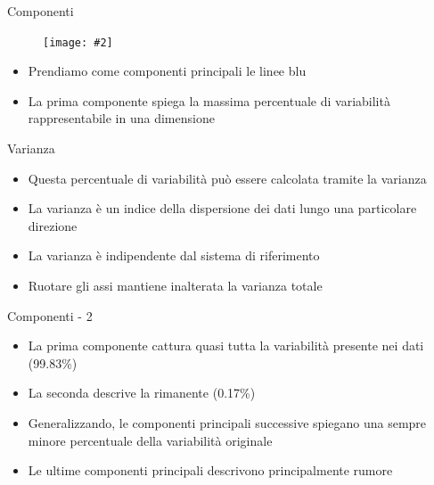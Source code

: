 \documentclass[xcolor={dvipsnames}]{beamer}%
\newcommand{\figcen}[2]{
	\begin{figure}
		\begin{center}
			\texttt{[image: \#2]}
		\end{center}
	\end{figure}
}
\begin{document}
		\begin{frame}{Componenti}
			\figcen{.7\textwidth}{componenti}
			\begin{itemize}
				\item Prendiamo come componenti principali le linee blu
				\item La prima componente spiega la massima percentuale di variabilità rappresentabile in una dimensione
			\end{itemize}
		\end{frame}
	
		\begin{frame}{Varianza}
			\begin{itemize}
				\item Questa percentuale di variabilità può essere calcolata tramite la varianza
				\item La varianza è un indice della dispersione dei dati lungo una particolare direzione
				\item La varianza è indipendente dal sistema di riferimento
				\item Ruotare gli assi mantiene inalterata la varianza totale
			\end{itemize}
		\end{frame}
	
		\begin{frame}{Componenti - 2}
			\begin{itemize}
				\item La prima componente cattura quasi tutta la variabilità presente nei dati (99.83\%)
				\item La seconda descrive la rimanente (0.17\%)
				\item Generalizzando, le componenti principali successive spiegano una sempre minore percentuale della variabilità originale
				\item Le ultime componenti principali descrivono principalmente rumore
			\end{itemize}
		\end{frame}
		
\end{document}
